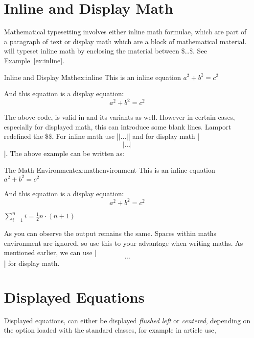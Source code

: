 \pagestyle{headings}
\normalfont

\section{Inline and Display Math}
Mathematical typesetting involves either inline math formulae, which are part of a paragraph of text or display math which are a block of mathematical material. \tex will typeset inline math by enclosing the material between  \$\ldots\$. See Example~\ref{ex:inline}.
\bigskip

\begin{texexample}{Inline and Display Math}{ex:inline}
This is an inline equation \(a^2+b^2=c^2\)

And this equation is a display equation:
\[a^2+b^2=c^2\]
\end{texexample}


The above code, is valid in \latex and its variants as well. However in certain cases, especially for displayed math, this can introduce some blank lines. Lamport redefined
the \$\$. For inline math use |\(|\ldots|\)| and for display math |\[|\ldots|\] |. The above example can be written as:
\bigskip

\begin{texexample}{The Math Environment}{ex:mathenvironment}
 This is an inline equation \(a^2+b^2=c^2\)

 And this equation is a display equation:
 \[a^2+b^2=c^2\]

 \begin{math}
 \sum_{i=1}^{n}i=\frac{1}{2}n\cdot(n+1)
 \end{math}
\end{texexample}



As you can observe the output remains the same.  Spaces within  maths environment are ignored, so use this to your advantage when writing maths. As mentioned earlier, we can use |\[...\]| for display math.


\section{Displayed Equations}


Displayed equations, can either be displayed \emph{flushed left} or \emph{centered}, depending on the option loaded with the standard classes, for example in article use,


